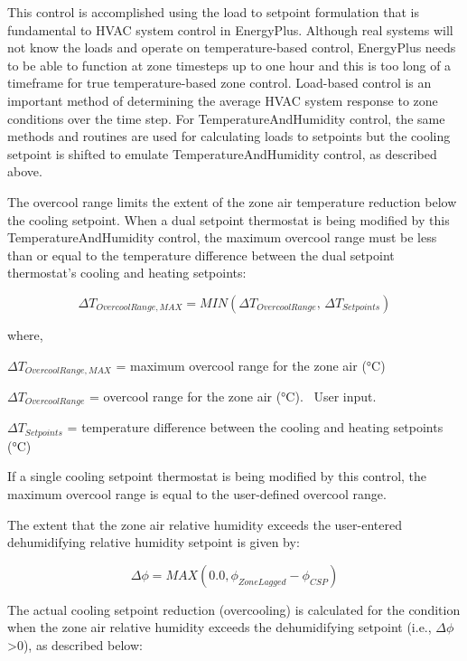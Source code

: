 This control is accomplished using the load to setpoint formulation that is fundamental to HVAC system control in EnergyPlus. Although real systems will not know the loads and operate on temperature-based control, EnergyPlus needs to be able to function at zone timesteps up to one hour and this is too long of a timeframe for true temperature-based zone control. Load-based control is an important method of determining the average HVAC system response to zone conditions over the time step. For TemperatureAndHumidity control, the same methods and routines are used for calculating loads to setpoints but the cooling setpoint is shifted to emulate TemperatureAndHumidity control, as described above.

The overcool range limits the extent of the zone air temperature reduction below the cooling setpoint. When a dual setpoint thermostat is being modified by this TemperatureAndHumidity control, the maximum overcool range must be less than or equal to the temperature difference between the dual setpoint thermostat's cooling and heating setpoints:

\begin{equation}
  \Delta {T_{OvercoolRange,MAX}} = MIN\left( {\Delta {T_{OvercoolRange}},\,\Delta {T_{Setpoints}}} \right)
\end{equation}

where,

\(\Delta {T_{OvercoolRange,MAX}}\) = maximum overcool range for the zone air (°C)

\(\Delta {T_{OvercoolRange}}\) = overcool range for the zone air (°C).~ User input.

\(\Delta {T_{Setpoints}}\) = temperature difference between the cooling and heating setpoints (°C)

If a single cooling setpoint thermostat is being modified by this control, the maximum overcool range is equal to the user-defined overcool range.

The extent that the zone air relative humidity exceeds the user-entered dehumidifying relative humidity setpoint is given by:

\begin{equation}
\Delta \phi  = MAX\left( {0.0,{\phi_{ZoneLagged}} - {\phi_{CSP}}} \right)
\end{equation}

The actual cooling setpoint reduction (overcooling) is calculated for the condition when the zone air relative humidity exceeds the dehumidifying setpoint (i.e., \(\Delta \phi\) \textgreater{}0), as described below:

